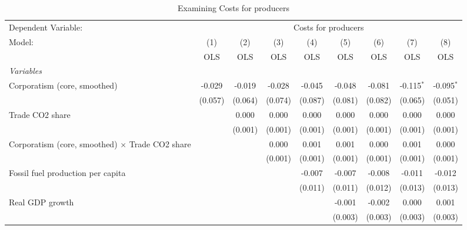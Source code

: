 
\begin{table}[htbp]
   \caption{Examining Costs for producers}
   \centering
   \begin{tabular}{lcccccccc}
      \toprule
      Dependent Variable: & \multicolumn{8}{c}{Costs for producers}\\
      Model:                                                 & (1)     & (2)     & (3)     & (4)     & (5)     & (6)     & (7)          & (8)\\  
                                                             &  OLS    & OLS     & OLS     & OLS     & OLS     & OLS     & OLS          & OLS\\  
      \midrule
      \emph{Variables}\\
      Corporatism (core, smoothed)                           & -0.029  & -0.019  & -0.028  & -0.045  & -0.048  & -0.081  & -0.115$^{*}$ & -0.095$^{*}$\\   
                                                             & (0.057) & (0.064) & (0.074) & (0.087) & (0.081) & (0.082) & (0.065)      & (0.051)\\   
      Trade CO2 share                                        &         & 0.000   & 0.000   & 0.000   & 0.000   & 0.000   & 0.000        & 0.000\\   
                                                             &         & (0.001) & (0.001) & (0.001) & (0.001) & (0.001) & (0.001)      & (0.001)\\   
      Corporatism (core, smoothed) $\times$ Trade CO2 share  &         &         & 0.000   & 0.001   & 0.001   & 0.000   & 0.001        & 0.000\\   
                                                             &         &         & (0.001) & (0.001) & (0.001) & (0.001) & (0.001)      & (0.001)\\   
      Fossil fuel production per capita                      &         &         &         & -0.007  & -0.007  & -0.008  & -0.011       & -0.012\\   
                                                             &         &         &         & (0.011) & (0.011) & (0.012) & (0.013)      & (0.013)\\   
      Real GDP growth                                        &         &         &         &         & -0.001  & -0.002  & 0.000        & 0.001\\   
                                                             &         &         &         &         & (0.003) & (0.003) & (0.003)      & (0.003)\\   

\end{tabular}
\end{table}
